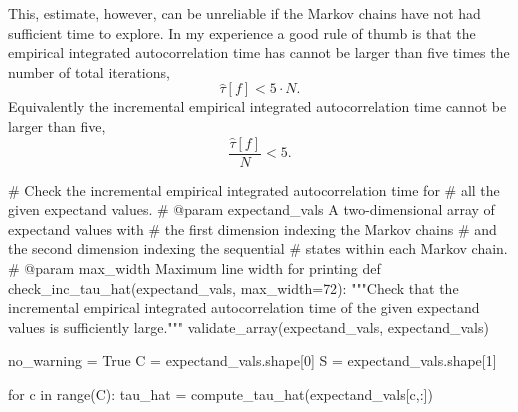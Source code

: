 \documentclass[
  letterpaper,
  DIV=11,
  numbers=noendperiod]{scrartcl}
\newenvironment{Shaded}{\begin{snugshade}}{\end{snugshade}}
\newcommand{\BuiltInTok}[1]{\textcolor[rgb]{0.00,0.23,0.31}{#1}}
\newcommand{\CommentTok}[1]{\textcolor[rgb]{0.37,0.37,0.37}{#1}}
\newcommand{\ControlFlowTok}[1]{\textcolor[rgb]{0.00,0.23,0.31}{#1}}
\newcommand{\DecValTok}[1]{\textcolor[rgb]{0.68,0.00,0.00}{#1}}
\newcommand{\KeywordTok}[1]{\textcolor[rgb]{0.00,0.23,0.31}{#1}}
\newcommand{\NormalTok}[1]{\textcolor[rgb]{0.00,0.23,0.31}{#1}}
\newcommand{\OperatorTok}[1]{\textcolor[rgb]{0.37,0.37,0.37}{#1}}
\newcommand{\StringTok}[1]{\textcolor[rgb]{0.13,0.47,0.30}{#1}}
\newcommand{\VariableTok}[1]{\textcolor[rgb]{0.07,0.07,0.07}{#1}}
\begin{document}
This, estimate, however, can be unreliable if the Markov chains have not
had sufficient time to explore. In my experience a good rule of thumb is
that the empirical integrated autocorrelation time has cannot be larger
than five times the number of total iterations, \[
\hat{\tau}[f] < 5 \cdot N.
\] Equivalently the incremental empirical integrated autocorrelation
time cannot be larger than five, \[
\frac{ \hat{\tau}[f] }{N} < 5.
\]

\begin{Shaded}
\begin{Highlighting}[]
\CommentTok{\# Check the incremental empirical integrated autocorrelation time for}
\CommentTok{\# all the given expectand values.}
\CommentTok{\# @param expectand\_vals A two{-}dimensional array of expectand values with}
\CommentTok{\#                       the first dimension indexing the Markov chains}
\CommentTok{\#                       and the second dimension indexing the sequential}
\CommentTok{\#                       states within each Markov chain.}
\CommentTok{\# @param max\_width Maximum line width for printing}
\KeywordTok{def}\NormalTok{ check\_inc\_tau\_hat(expectand\_vals, max\_width}\OperatorTok{=}\DecValTok{72}\NormalTok{):}
  \CommentTok{"""Check that the incremental empirical integrated autocorrelation}
\CommentTok{     time of the given expectand values is sufficiently large."""}
\NormalTok{  validate\_array(expectand\_vals, }\StringTok{\textquotesingle{}expectand\_vals\textquotesingle{}}\NormalTok{)}

\NormalTok{  no\_warning }\OperatorTok{=} \VariableTok{True}
\NormalTok{  C }\OperatorTok{=}\NormalTok{ expectand\_vals.shape[}\DecValTok{0}\NormalTok{]}
\NormalTok{  S }\OperatorTok{=}\NormalTok{ expectand\_vals.shape[}\DecValTok{1}\NormalTok{]}

  \ControlFlowTok{for}\NormalTok{ c }\KeywordTok{in} \BuiltInTok{range}\NormalTok{(C):}
\NormalTok{    tau\_hat }\OperatorTok{=}\NormalTok{ compute\_tau\_hat(expectand\_vals[c,:])}


\end{Highlighting}
\end{Shaded}
\end{document}

